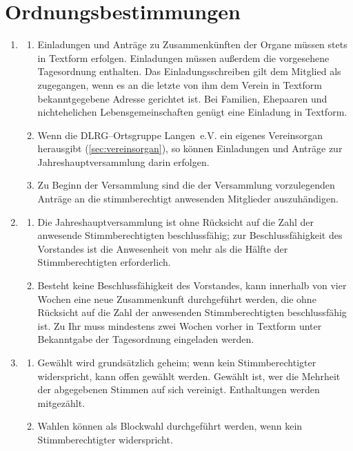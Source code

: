 \documentclass[%
12pt, %
a4paper, %
headsepline, %
parskip, %
headings=normal, %
]{scrreprt}
\begin{document}
\section{Ordnungsbestimmungen}
\label{sec:ordnungsbestimmungen}
\begin{enumerate}
    \item \begin{enumerate}[noitemsep]
        \item Einladungen und Anträge zu Zusammenkünften der Organe müssen stets in Textform erfolgen. Einladungen müssen außerdem die vorgesehene Tagesordnung enthalten. Das Einladungsschreiben gilt dem Mitglied als zugegangen, wenn es an die letzte von ihm dem Verein in Textform bekanntgegebene Adresse gerichtet ist. Bei Familien, Ehepaaren und nichtehelichen Lebensgemeinschaften genügt eine Einladung in Textform.
        \item Wenn die DLRG--Ortsgruppe Langen~e.V. ein eigenes Vereinsorgan herausgibt (\ref{sec:vereinsorgan}), so können Einladungen und Anträge zur Jahreshauptversammlung darin erfolgen.
        \item Zu Beginn der Versammlung sind die der Versammlung vorzulegenden Anträge an die stimmberechtigt anwesenden Mitglieder auszuhändigen.
      \end{enumerate}
    \item \begin{enumerate}[noitemsep]
        \item Die Jahreshauptversammlung ist ohne Rücksicht auf die Zahl der anwesende Stimmberechtigten beschlussfähig; zur Beschlussfähigkeit des Vorstandes ist die Anwesenheit von mehr als die Hälfte der Stimmberechtigten erforderlich. 
        \item Besteht keine Beschlussfähigkeit des Vorstandes, kann innerhalb von vier Wochen eine neue Zusammenkunft durchgeführt werden, die ohne Rücksicht auf die Zahl der anwesenden Stimmberechtigten beschlussfähig ist. Zu Ihr muss mindestens zwei Wochen vorher in Textform unter Bekanntgabe der Tagesordnung eingeladen werden.
      \end{enumerate}
    \item \begin{enumerate}[noitemsep]
        \item Gewählt wird grundsätzlich geheim; wenn kein Stimmberechtigter widerspricht, kann offen gewählt werden. Gewählt ist, wer die Mehrheit der abgegebenen Stimmen auf sich vereinigt. Enthaltungen werden mitgezählt.
        \item Wahlen können als Blockwahl durchgeführt werden, wenn kein Stimmberechtigter widerspricht.

\end{enumerate}
\end{enumerate}
\end{document}
